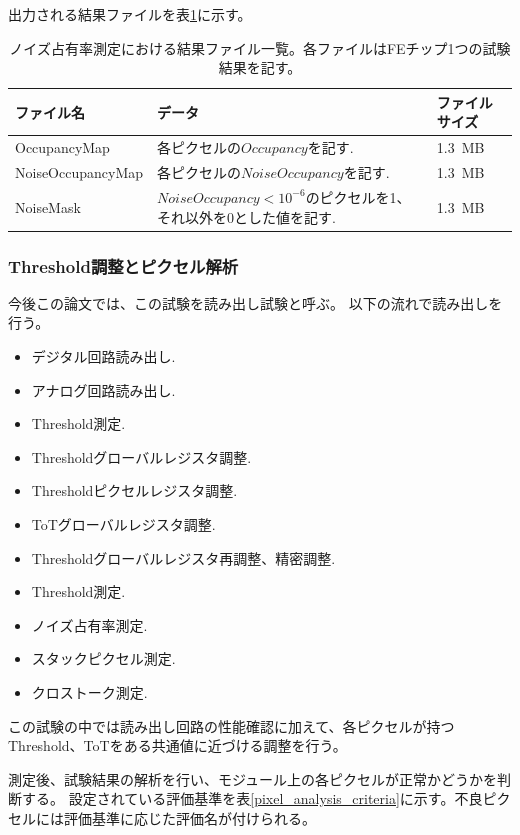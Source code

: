 出力される結果ファイルを表\ref{noise_result_files}に示す。

\begin{table}[tbp]
\begin{center}
\caption[ノイズ占有率測定における結果ファイル一覧]{ノイズ占有率測定における結果ファイル一覧。各ファイルはFEチップ1つの試験結果を記す。}
\label{noise_result_files}
  \small
  \begin{tabular}{|lll|} \hline
    ファイル名 & データ & ファイルサイズ \\ \hline
    OccupancyMap      & 各ピクセルの$Occupancy$を記す. & 1.3~MB \\ 
    NoiseOccupancyMap & 各ピクセルの$NoiseOccupancy$を記す. & 1.3~MB \\ 
    NoiseMask         & $NoiseOccupancy < 10^{-6}$のピクセルを1、それ以外を0とした値を記す. & 1.3~MB \\ \hline 
  \end{tabular}
\end{center}
\end{table}

\clearpage
\subsubsection{Threshold調整とピクセル解析}\label{sec:pixel_analysis}
今後この論文では、この試験を読み出し試験と呼ぶ。
以下の流れで読み出しを行う。
\begin{itemize}
  \item デジタル回路読み出し.
  \item アナログ回路読み出し.
  \item Threshold測定.
  \item Thresholdグローバルレジスタ調整.
  \item Thresholdピクセルレジスタ調整.
  \item ToTグローバルレジスタ調整.
  \item Thresholdグローバルレジスタ再調整、精密調整.
  \item Threshold測定.
  \item ノイズ占有率測定.
  \item スタックピクセル測定.
  \item クロストーク測定.
\end{itemize}
この試験の中では読み出し回路の性能確認に加えて、各ピクセルが持つThreshold、ToTをある共通値に近づける調整を行う。

測定後、試験結果の解析を行い、モジュール上の各ピクセルが正常かどうかを判断する。
設定されている評価基準を表\ref{pixel_analysis_criteria}に示す。不良ピクセルには評価基準に応じた評価名が付けられる。

